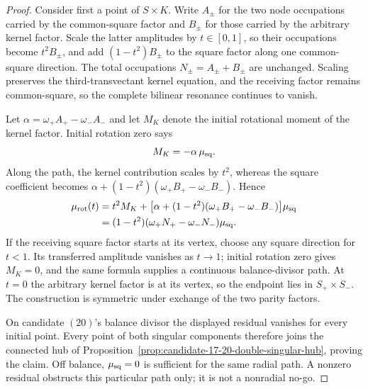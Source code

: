 \documentclass[11pt]{article}
\theoremstyle{definition}
\theoremstyle{remark}
\begin{document}
\begin{proof}
Consider first a point of \(S\times K\).  Write \(A_\pm\) for the two node
occupations carried by the common-square factor and \(B_\pm\) for those
carried by the arbitrary kernel factor.  Scale the latter amplitudes by
\(t\in[0,1]\), so their occupations become \(t^2B_\pm\), and add
\((1-t^2)B_\pm\) to the square factor along one common-square direction.
The total occupations \(N_\pm=A_\pm+B_\pm\) are unchanged.  Scaling
preserves the third-transvectant kernel equation, and the receiving factor
remains common-square, so the complete bilinear resonance continues to
vanish.

Let
\(\alpha=\omega_+A_+-\omega_-A_-\) and let \(M_K\) denote the initial
rotational moment of the kernel factor.  Initial rotation zero says
\[
 M_K=-\alpha\,\mu_{\rm sq}.
\]
Along the path, the kernel contribution scales by \(t^2\), whereas the
square coefficient becomes
\(\alpha+(1-t^2)(\omega_+B_+-\omega_-B_-)\).  Hence
\[
\begin{aligned}
 \mu_{\rm rot}(t)
 &=t^2M_K+
   \bigl[\alpha+(1-t^2)(\omega_+B_+-\omega_-B_-)\bigr]\mu_{\rm sq}\\
 &=(1-t^2)(\omega_+N_+-\omega_-N_-)\mu_{\rm sq}.
\end{aligned}
\]
If the receiving square factor starts at its vertex, choose any square
direction for \(t<1\).  Its transferred amplitude vanishes as \(t\to1\);
initial rotation zero gives \(M_K=0\), and the same formula supplies a
continuous balance-divisor path.  At \(t=0\) the arbitrary kernel factor is
at its vertex, so the endpoint lies in \(S_+\times S_-\).  The construction
is symmetric under exchange of the two parity factors.

On candidate \((20)\)'s balance divisor the displayed residual vanishes for
every initial point.  Every point of both singular components therefore
joins the connected hub of
Proposition~\ref{prop:candidate-17-20-double-singular-hub}, proving the
claim.  Off balance, \(\mu_{\rm sq}=0\) is sufficient for the same radial
path.  A nonzero residual obstructs this particular path only; it is not a
nonradial no-go.
\end{proof}
\end{document}
